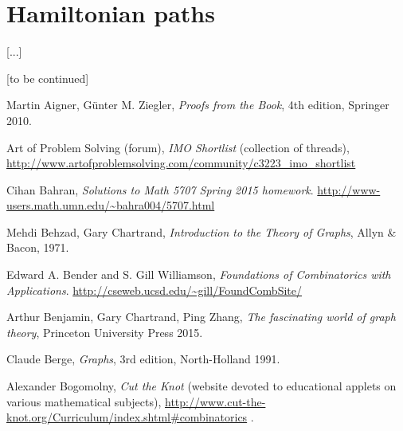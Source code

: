 \documentclass[numbers=enddot,12pt,final,onecolumn,notitlepage]{scrartcl}%
\theoremstyle{definition}
\begin{document}
\section{\label{sect.hamilton}Hamiltonian paths}


[...]

[to be continued]

\begin{thebibliography}{9999999999}                                                                                       %

Martin Aigner, G\"{u}nter M. Ziegler,
\textit{Proofs from the Book}, 4th edition, Springer 2010.

Art of Problem Solving (forum),
\textit{IMO Shortlist} (collection of threads),
\newline
\url{http://www.artofproblemsolving.com/community/c3223_imo_shortlist}


Cihan Bahran,
\textit{Solutions to Math 5707 Spring 2015 homework}.
\newline \url{http://www-users.math.umn.edu/~bahra004/5707.html}


Mehdi Behzad, Gary Chartrand,
\textit{Introduction to the Theory of Graphs},
Allyn \& Bacon, 1971.

Edward A. Bender and S. Gill Williamson,
\textit{Foundations of Combinatorics with Applications}.
\newline \url{http://cseweb.ucsd.edu/~gill/FoundCombSite/}

Arthur Benjamin, Gary Chartrand,
Ping Zhang,
\textit{The fascinating world of graph theory},
Princeton University Press 2015.

Claude Berge,
\textit{Graphs}, 3rd edition, North-Holland 1991.

Alexander Bogomolny,
\textit{Cut the Knot} (website devoted to educational applets on
various mathematical subjects),
\url{http://www.cut-the-knot.org/Curriculum/index.shtml#combinatorics} .


\end{thebibliography}
\end{document}
